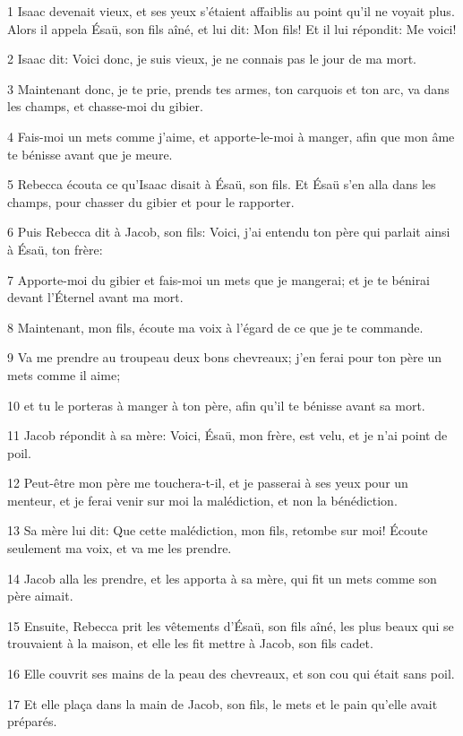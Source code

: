 \par 1 Isaac devenait vieux, et ses yeux s'étaient affaiblis au point qu'il ne voyait plus. Alors il appela Ésaü, son fils aîné, et lui dit: Mon fils! Et il lui répondit: Me voici!
\par 2 Isaac dit: Voici donc, je suis vieux, je ne connais pas le jour de ma mort.
\par 3 Maintenant donc, je te prie, prends tes armes, ton carquois et ton arc, va dans les champs, et chasse-moi du gibier.
\par 4 Fais-moi un mets comme j'aime, et apporte-le-moi à manger, afin que mon âme te bénisse avant que je meure.
\par 5 Rebecca écouta ce qu'Isaac disait à Ésaü, son fils. Et Ésaü s'en alla dans les champs, pour chasser du gibier et pour le rapporter.
\par 6 Puis Rebecca dit à Jacob, son fils: Voici, j'ai entendu ton père qui parlait ainsi à Ésaü, ton frère:
\par 7 Apporte-moi du gibier et fais-moi un mets que je mangerai; et je te bénirai devant l'Éternel avant ma mort.
\par 8 Maintenant, mon fils, écoute ma voix à l'égard de ce que je te commande.
\par 9 Va me prendre au troupeau deux bons chevreaux; j'en ferai pour ton père un mets comme il aime;
\par 10 et tu le porteras à manger à ton père, afin qu'il te bénisse avant sa mort.
\par 11 Jacob répondit à sa mère: Voici, Ésaü, mon frère, est velu, et je n'ai point de poil.
\par 12 Peut-être mon père me touchera-t-il, et je passerai à ses yeux pour un menteur, et je ferai venir sur moi la malédiction, et non la bénédiction.
\par 13 Sa mère lui dit: Que cette malédiction, mon fils, retombe sur moi! Écoute seulement ma voix, et va me les prendre.
\par 14 Jacob alla les prendre, et les apporta à sa mère, qui fit un mets comme son père aimait.
\par 15 Ensuite, Rebecca prit les vêtements d'Ésaü, son fils aîné, les plus beaux qui se trouvaient à la maison, et elle les fit mettre à Jacob, son fils cadet.
\par 16 Elle couvrit ses mains de la peau des chevreaux, et son cou qui était sans poil.
\par 17 Et elle plaça dans la main de Jacob, son fils, le mets et le pain qu'elle avait préparés.
